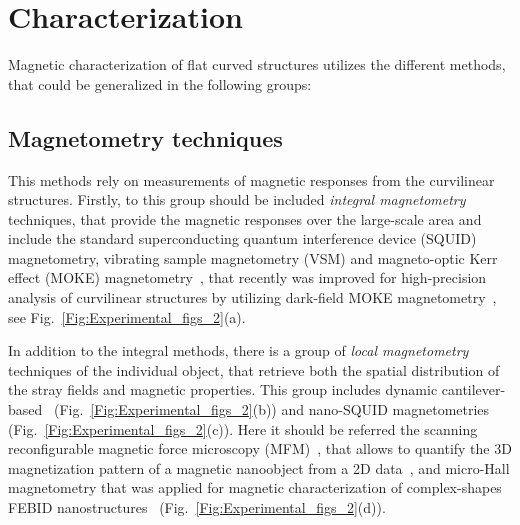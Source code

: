 \section{Characterization}\label{sec:characterization}

Magnetic characterization of flat curved structures utilizes the different methods, that could be generalized in the following groups:

\subsection{Magnetometry techniques}

This methods rely on measurements of magnetic responses from the curvilinear structures. Firstly, to this group should be included \textit{integral magnetometry} techniques, that provide the magnetic responses over the large-scale area and include the standard superconducting quantum interference device (SQUID) magnetometry, vibrating sample magnetometry (VSM) and magneto-optic Kerr effect (MOKE) magnetometry~\cite{Streubel12b,Streubel13c,Streubel14,Ueltzhoeffer16,Hunt20}, that recently was improved for high-precision analysis of curvilinear structures by utilizing dark-field MOKE magnetometry~\cite{Sanz-Hernandez17}, see Fig.~\ref{Fig:Experimental_figs_2}(a).

In addition to the integral methods, there is a group of \textit{local magnetometry} techniques  of the individual object, that retrieve both the spatial distribution of the stray fields and magnetic properties. This group includes dynamic cantilever-based~\cite{Degen09,Weber12,Mehlin18,Braakman19} (Fig.~\ref{Fig:Experimental_figs_2}(b)) and nano-SQUID magnetometries~\cite{Vasyukov18} (Fig.~\ref{Fig:Experimental_figs_2}(c)). Here it should be referred the scanning reconfigurable magnetic force microscopy (MFM)~\cite{Kazakova19,May19,Corte-Leon19}, that allows to quantify the 3D magnetization pattern of a magnetic nanoobject from a 2D data~\cite{Vock14}, and micro-Hall magnetometry that was applied for magnetic characterization of complex-shapes FEBID nanostructures~\cite{Keller18,Mamoori18} (Fig.~\ref{Fig:Experimental_figs_2}(d)). 

